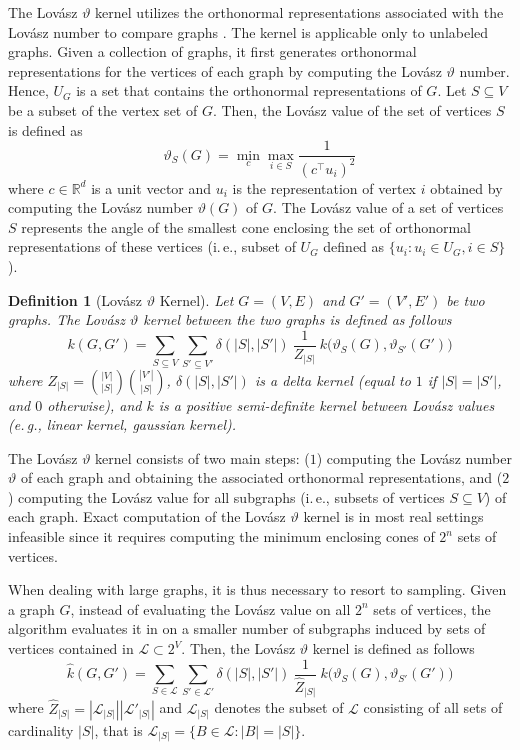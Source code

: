 \documentclass[twoside,11pt]{article}
\newcommand{\eg}{e.\,g., }
\newcommand{\ie}{i.\,e., }
\newtheorem{definition}{Definition}
\begin{document}
The Lov\'asz $\vartheta$ kernel utilizes the orthonormal representations associated with the Lov\'asz number to compare graphs .
The kernel is applicable only to unlabeled graphs.
Given a collection of graphs, it first generates orthonormal representations for the vertices of each graph by computing the Lov\'asz $\vartheta$ number.
Hence, $U_G$ is a set that contains the orthonormal representations of $G$.
Let $S \subseteq V$ be a subset of the vertex set of $G$.
Then, the Lov\'asz value of the set of vertices $S$ is defined as
\begin{equation}
    \vartheta_S(G) = \min_{c} \max_{i \in S} \frac{1}{(c^\top u_i)^2}
\end{equation}
where $c \in \mathbb{R}^d$ is a unit vector and $u_i$ is the representation of vertex $i$ obtained by computing the Lov\'asz number $\vartheta(G)$ of $G$.
The Lov\'asz value of a set of vertices $S$ represents the angle of the smallest cone enclosing the set of orthonormal representations of these vertices (\ie subset of $U_G$ defined as $\{ u_i : u_i \in U_G, i \in S \}$).

\begin{definition}[Lov\'asz $\vartheta$ Kernel]
	Let $G=(V,E)$ and $G'=(V',E')$ be two graphs.
	The Lov\'asz $\vartheta$ kernel between the two graphs is defined as follows
	\begin{equation}
	    k(G, G') = \sum_{S \subseteq V} \sum_{S' \subseteq V'} \delta(|S|, |S'|) \ \frac{1}{Z_{|S|}} \ k \big( \vartheta_S(G), \vartheta_{S'}(G') \big)
	\end{equation}
	where $Z_{|S|} = \binom{|V|}{|S|} \binom{|V'|}{|S|}$, $\delta(|S|, |S'|)$ is a delta kernel (equal to $1$ if $|S|=|S'|$, and $0$ otherwise), and $k$ is a positive semi-definite kernel between Lov\'asz values (\eg linear kernel, gaussian kernel).
\end{definition}
The Lov\'asz $\vartheta$ kernel consists of two main steps: ($1$) computing the Lov\'asz number $\vartheta$ of each graph and obtaining the associated orthonormal representations, and ($2$) computing the Lov\'asz value for all subgraphs (\ie subsets of vertices $S \subseteq V$) of each graph.
Exact computation of the Lov\'asz $\vartheta$ kernel is in most real settings infeasible since it requires computing the minimum enclosing cones of $2^n$ sets of vertices.

When dealing with large graphs, it is thus necessary to resort to sampling.
Given a graph $G$, instead of evaluating the Lov\'asz value on all $2^n$ sets of vertices, the algorithm evaluates it in on a smaller number of subgraphs induced by sets of vertices contained in $\mathcal{L} \subset 2^V$.
Then, the Lov\'asz $\vartheta$ kernel is defined as follows
\begin{equation}
    \hat{k}(G, G') = \sum_{S \in \mathcal{L}} \sum_{S' \in \mathcal{L}'} \delta(|S|, |S'|) \ \frac{1}{\hat{Z}_{|S|}} \ k \big( \vartheta_S(G), \vartheta_{S'}(G') \big)
\end{equation}
where $\hat{Z}_{|S|} = |\mathcal{L}_{|S|}| |\mathcal{L}'_{|S|}|$ and $\mathcal{L}_{|S|}$ denotes the subset of $\mathcal{L}$ consisting of all sets of cardinality $|S|$, that is $\mathcal{L}_{|S|} = \{ B \in \mathcal{L} : |B| = |S| \}$.
\end{document}

